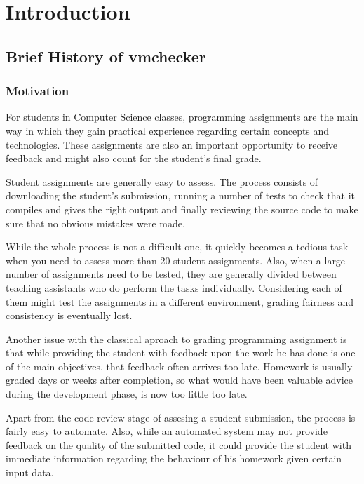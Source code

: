 \chapter{Introduction}
\label{chapter:intro}

\section{Brief History of vmchecker}
\label{sec:vmc-history}

\subsection{Motivation}
\label{sub-sec:vmc-history-motiv}

For students in Computer Science classes, programming assignments are the main
way in which they gain practical experience regarding certain concepts and 
technologies. These assignments are also an important opportunity to receive 
feedback and might also count for the student's final grade.

Student assignments are generally easy to assess. The process consists of 
downloading the student's submission, running a number of tests to check that 
it compiles and gives the right output and finally reviewing the source code
to make sure that no obvious mistakes were made.

While the whole process is not a difficult one, it quickly becomes a tedious task
when you need to assess more than 20 student assignments. Also, when a large number
of assignments need to be tested, they are generally divided between teaching 
assistants who do perform the tasks individually. Considering each of them might
test the assignments in a different environment, grading fairness and consistency
is eventually lost.

Another issue with the classical aproach to grading programming assignment is that
while providing the student with feedback upon the work he has done is one of the
main objectives, that feedback often arrives too late. Homework is usually graded
days or weeks after completion, so what would have been valuable advice during the
development phase, is now too little too late.

Apart from the code-review stage of assesing a student submission, the process is 
fairly easy to automate. Also, while an automated system may not provide feedback 
on the quality of the submitted code, it could provide the student with immediate
information regarding the behaviour of his homework given certain input data.

